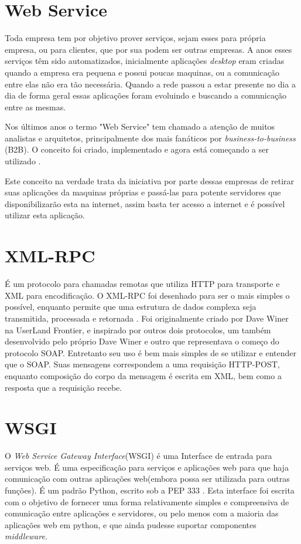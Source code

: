 \section{Web Service}
Toda empresa tem por objetivo prover serviços, sejam esses para própria empresa, ou para clientes, que por sua podem ser outras empresas. A anos esses serviços têm sido automatizados, inicialmente aplicações \textit{desktop} eram criadas quando a empresa era pequena e possui poucas maquinas, ou a comunicação entre elas não era tão necessária. Quando a rede passou a estar presente no dia a dia de forma geral essas aplicações foram evoluindo e buscando a comunicação entre as mesmas.

\begin{citacao}
Nos últimos anos o termo "Web Service" tem chamado a atenção de muitos analistas e arquitetos, principalmente dos mais fanáticos por \textit{business-to-business} (B2B). O conceito foi criado, implementado e agora está começando a ser utilizado \cite{Pamplona 2010}.
\end{citacao}

Este conceito na verdade trata da iniciativa por parte dessas empresas de retirar suas aplicações da maquinas próprias e passá-las para potente servidores que disponibilizarão esta na internet, assim basta ter acesso a internet e é possível utilizar esta aplicação.

\section{XML-RPC}
É um protocolo para chamadas remotas que utiliza HTTP para transporte e XML para encodificação. O XML-RPC foi desenhado para ser o mais simples o possível, enquanto permite que uma estrutura de dados complexa seja transmitida, processada e retornada \cite{NEWS 2011}.
Foi originalmente criado por Dave Winer na UserLand Frontier, e inspirado por outros dois protocolos, um também desenvolvido pelo próprio Dave Winer e outro que representava o começo do protocolo SOAP. Entretanto seu uso é bem mais simples de se utilizar e entender que o SOAP. Suas mensagens correspondem a uma requisição HTTP-POST, enquanto composição do corpo da mensagem é escrita em XML, bem como a resposta que a requisição recebe.

\section{WSGI}
O \textit{Web Service Gateway Interface}(WSGI) é uma Interface de entrada para serviços web. É uma especificação para serviços e aplicações web para que haja comunicação com outras aplicações web(embora possa ser utilizada para outras funções). É um padrão Python, escrito sob a PEP 333 \cite{WSGI.ORG 2012}.
Esta interface foi escrita com o objetivo de fornecer uma forma relativamente simples e compreensiva de comunicação entre aplicações e servidores, ou pelo menos com a maioria das aplicações web em python, e que ainda pudesse suportar componentes \textit{middleware}.

